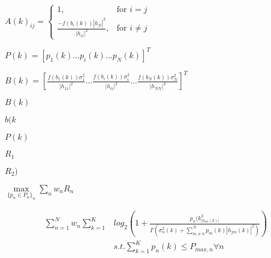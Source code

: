 {{\newpage\clearpage
{}%
$\displaystyle A(k)_{ij}=\begin{cases} 1, & \mbox{for } i = j \\\frac{-f(b_i(k))|h_{ji}|^2}{|h_{ii}|^2}, & \mbox{for } i \neq j \end{cases}$%
\lthtmlindisplaymathZ
\lthtmlcheckvsize\clearpage}

{\newpage\clearpage
{}%
$\displaystyle P(k)=[p_1(k) \dots p_i(k) \dots p_N(k)]^T$%
\lthtmlindisplaymathZ
\lthtmlcheckvsize\clearpage}

{\newpage\clearpage
{}%
$\displaystyle B(k)=\left[\frac{f(b_1(k)) \sigma^2_1}{|h_{11}|^2} \dots \frac{f(b_i(k)) \sigma^2_i}{|h_{ii}|^2} \dots \frac{f(b_N(k))\sigma^2_N}{|h_{NN}|^2}\right]^T$%
\lthtmlindisplaymathZ
\lthtmlcheckvsize\clearpage}

{\newpage\clearpage
{}%
$ B(k)$%
\lthtmlinlinemathZ
\lthtmlcheckvsize\clearpage}

{\newpage\clearpage
{}%
$ b(k$%
\lthtmlinlinemathZ
\lthtmlcheckvsize\clearpage}

{\newpage\clearpage
{}%
$ P(k)$%
\lthtmlinlinemathZ
\lthtmlcheckvsize\clearpage}

{\newpage\clearpage
{}%
$ R_1$%
\lthtmlinlinemathZ
\lthtmlcheckvsize\clearpage}

{\newpage\clearpage
{}%
$ R_2)$%
\lthtmlinlinemathZ
\lthtmlcheckvsize\clearpage}

{\newpage\clearpage
{}%
$\displaystyle \max\limits_{\{p_n\in P_n\}_n} \sum_n w_n R_n$%
\lthtmlindisplaymathZ
\lthtmlcheckvsize\clearpage}

{\newpage\clearpage
{}%
\begin{displaymath}\begin{array}{rc} \sum\limits_{n=1}^N w_n \sum\limits_{k=1}^K & log_2 \left(1+\frac{p_n(k_|h_{nn}(k)|^2}{\Gamma\left(\sigma_n^2(k)+\sum\limits_{m\neq n}^N p_m(k)|h_{jm}(k)|^2\right)}\right)\\&s.t.\sum_{k=1}^Kp_n(k) \leq P_{max,n} \forall n \end{array}\end{displaymath}%
\lthtmldisplayZ
\lthtmlcheckvsize\clearpage}

}
